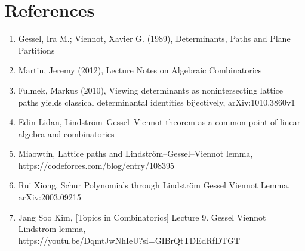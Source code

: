 \documentclass[a4paper]{article}
\begin{document}
\section*{References}
\begin{enumerate}
    \item Gessel, Ira M.; Viennot, Xavier G. (1989), Determinants, Paths and Plane Partitions
    \item Martin, Jeremy (2012), Lecture Notes on Algebraic Combinatorics
    \item Fulmek, Markus (2010), Viewing determinants as nonintersecting lattice paths yields classical determinantal identities bijectively, arXiv:1010.3860v1
    \item Edin Lidan, Lindström–Gessel–Viennot theorem as a common point of linear algebra and combinatorics
    \item Miaowtin, Lattice paths and Lindström–Gessel–Viennot lemma,\\ https://codeforces.com/blog/entry/108395
    \item Rui Xiong, Schur Polynomials through Lindström Gessel Viennot Lemma, arXiv:2003.09215
    \item Jang Soo Kim, [Topics in Combinatorics] Lecture 9. Gessel Viennot Lindstrom lemma,\\
 https://youtu.be/DqmtJwNhIeU?si=GIBrQtTDEdRfDTGT
\end{enumerate}
\end{document}
